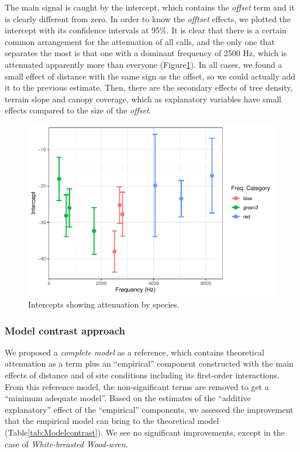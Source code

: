 \documentclass[fleqn,10pt,lineno]{wlpeerj} %
\begin{document}
The main signal is caught by the intercept, which contains the \emph{offset} term and it is clearly different from zero. In order to know the \emph{offtset} effects, we plotted the intercept with its confidence intervals at 95\%. It is clear that there is a certain common arrangement for the attenuation of all calls, and the only one that separates the most is that one with a dominant frequency of 2500 Hz, which is attenuated apparently more than everyone (Figure\ref{fig:Intercepts}). In all cases, we found a small effect of distance with the same sign as the offset, so we could actually add it to the previous estimate. Then, there are the secondary effects of tree density, terrain slope and canopy coverage, which as explanatory variables have small effects compared to the size of the \emph{offset}.

\begin{figure}

{\centering \includegraphics[width=1\linewidth]{ASR_MyPaper_2020_files/figure-latex/Intercepts-1} 

}

\caption{Intercepts showing attenuation by species.\label{fig:Intercepts}}\label{fig:Intercepts}
\end{figure}

\hypertarget{model-contrast-approach}{%
\subsubsection*{Model contrast approach}\label{model-contrast-approach}}

We proposed a \emph{complete model} as a reference, which contains theoretical attenuation as a term plus an ``empirical'' component constructed with the main effects of distance and of site conditions including its first-order interactions. From this reference model, the non-significant terms are removed to get a ``minimum adequate model''. Based on the estimates of the ``additive explanatory'' effect of the ``empirical'' components, we assessed the improvement that the empirical model can bring to the theoretical model (Table\ref{tab:Modelcontrast}). We see no significant improvements, except in the case of \emph{White-breasted Wood-wren}.
\end{document}
